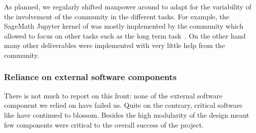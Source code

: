 As planned, we regularly shifted manpower around to adapt for the
variability of the involvement of the community in the different
tasks. For example, the SageMath Jupyter kernel of
 was mostly implemented by the
community which allowed to focus on other tasks such as the long term
task~.  On
the other hand many other deliverables were implemented with very
little help from the community.

\subsubsection{Reliance on external software components}

There is not much to report on this front: none of the external
software component we relied on have failed us. Quite on the contrary,
critical software like \Jupyter have continued to blossom. Besides the
high modularity of the design meant few components were critical to
the overall success of the project.


